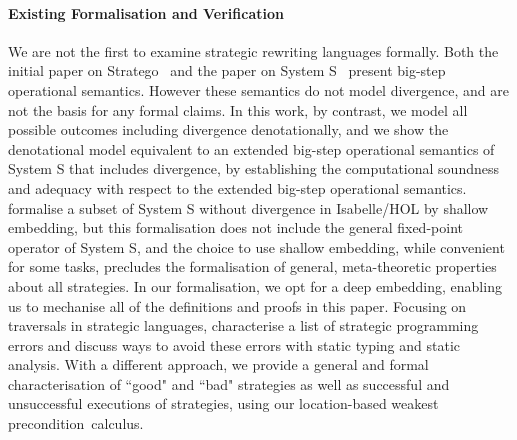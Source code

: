 \paragraph*{Existing Formalisation and Verification}
We are not the first to examine strategic rewriting languages formally. Both the initial paper on Stratego~\citep{DBLP:conf/icfp/VisserBT98} and the paper on System S~\citep{VISSER1998422} present big-step operational semantics. However these semantics do not model divergence, and are not the basis for any formal claims. In this work, by contrast, we model all possible outcomes including divergence denotationally, and we show the denotational model equivalent to an extended big-step operational semantics of System S that includes divergence, by establishing the computational soundness and adequacy with respect to the extended big-step operational semantics. \citet{DBLP:conf/ppdp/KaiserL09} formalise a subset of System S without divergence in Isabelle/HOL by shallow embedding, but this formalisation does not include the general fixed-point operator of System S, and the choice to use shallow embedding, while convenient for some tasks, precludes the formalisation of general, meta-theoretic properties about all strategies. In our formalisation, we opt for a deep embedding, enabling us to mechanise all of the definitions and proofs in this paper. Focusing on traversals in strategic languages, \citet{lammel2013programming} characterise a list of strategic programming errors and discuss ways to avoid these errors with static typing and static analysis. With a different approach, we provide a general and formal characterisation of ``good" and ``bad" strategies as well as successful and unsuccessful executions of strategies, using our location-based weakest precondition~calculus.

